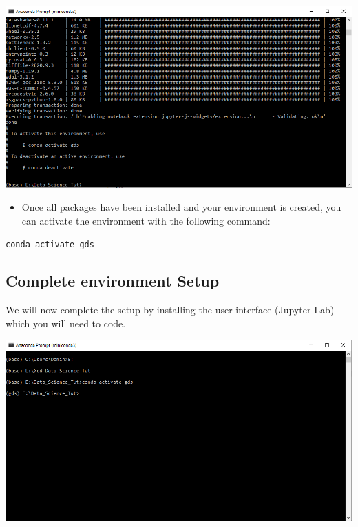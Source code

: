 \documentclass[
]{book}
\providecommand{\tightlist}{%
  \setlength{\itemsep}{0pt}\setlength{\parskip}{0pt}}
\begin{document}
\begin{center}\includegraphics[width=13.6in]{figs/chp4/Conda_7} \end{center}

\begin{itemize}
\tightlist
\item
  Once all packages have been installed and your environment is created, you can activate the environment with the following command:
\end{itemize}

\texttt{conda\ activate\ gds}

\hypertarget{complete-environment-setup}{%
\subsection{Complete environment Setup}\label{complete-environment-setup}}

We will now complete the setup by installing the user interface (Jupyter Lab) which you will need to code.

\begin{center}\includegraphics[width=13.61in]{figs/chp4/Conda_8} \end{center}
\end{document}
